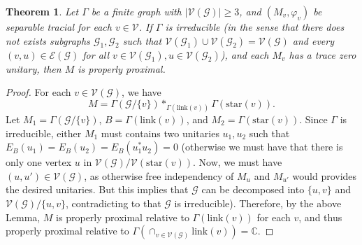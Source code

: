 \documentclass[a4paper, 11pt, reqno]{amsart}
\numberwithin{equation}{section}
\theoremstyle{plain}
\newtheorem{thm}{Theorem}[section]
\theoremstyle{remark}
\theoremstyle{definition}
\newcommand{\VV}{{\mathcal V}}
\newcommand{\EE}{{\mathcal E}}
\newcommand{\GG}{{\mathcal G}}
\begin{document}
\begin{thm}
    Let $\Gamma$ be a finite graph with $|\VV(\GG)|\geq 3$, and $(M_v,\varphi_v)$ be separable tracial for each $v\in \VV$. If $\Gamma$ is irreducible (in the sense that there does not exists subgraphs $\GG_1,\GG_2$ such that $ \VV(\GG_1)\cup \VV(\GG_2)=\VV(\GG) $ and every $(v,u)\in \EE(\GG) $ for all $v\in\VV(\GG_1),u\in \VV(\GG_2)$), and each $M_v$ has a trace zero unitary, then $M$ is properly proximal.
\end{thm}
\begin{proof}
    For each $v\in \VV(\GG)$, we have
    $$M = \Gamma(\GG/\{v\} )\ast_{\Gamma(\text{link}(v))} \Gamma(\text{star}(v)).$$
    Let $ M_1 =\Gamma(\GG/\{v\} )$, $B = \Gamma(\text{link}(v))$, and $M_2 =\Gamma(\text{star}(v)) $. Since $\Gamma$ is irreducible, either $ M_1 $ must contains two unitaries $ u_1,u_2$ such that $ E_B(u_1)=E_B(u_2)=E_B(u_1^*u_2) =0 $ (otherwise we must have that there is only one vertex $u$ in $\VV(\GG)/\VV(\text{star}(v))$. Now, we must have $(u,u') \in \VV(\GG)$, as otherwise free independency of $M_u $ and $M_{u'}$ would provides the desired unitaries. But this implies that $\GG$ can be decomposed into $ \{u,v\} $ and $ \VV(\GG)/\{u,v\} $, contradicting to that $\GG$ is irreducible). Therefore, by the above Lemma, $ M$ is properly proximal relative to $ \Gamma( \text{link}(v) )$ for each $v$, and thus properly proximal relative to $ \Gamma( \cap_{v\in \VV(\GG)}\text{link}(v) ) =\mathbb{C}$.
\end{proof}
\end{document}
